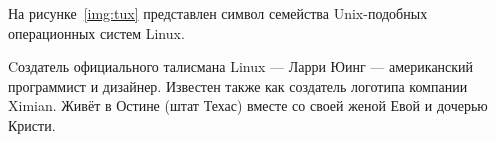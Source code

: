 \documentclass{bmstu}
\begin{document}
На рисунке~\ref{img:tux} представлен символ семейства Unix-подобных операционных систем Linux.


Cоздатель официального талисмана Linux --- Ларри Юинг --- американский программист и дизайнер.
Известен также как создатель логотипа компании Ximian.
Живёт в Остине (штат Техас) вместе со своей женой Евой и дочерью Кристи.
\end{document}
